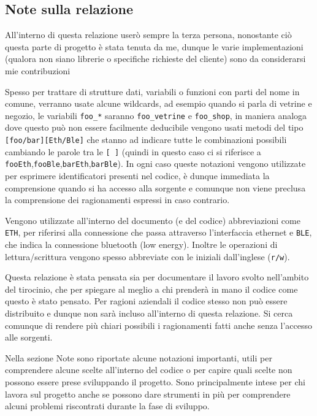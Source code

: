 \documentclass[a4paper,12pt]{article}
\begin{document}
\begin{em}

  \subsection{Note sulla relazione}

  All'interno di questa relazione user\`o sempre la terza persona, nonostante ci\`o questa parte di progetto \`e stata tenuta da me, dunque le varie implementazioni (qualora non siano librerie o specifiche richieste del cliente) sono da considerarsi mie contribuzioni

  Spesso per trattare di strutture dati, variabili o funzioni con parti del nome in comune, verranno usate alcune \textup{wildcards}, ad esempio quando si parla di vetrine e negozio, le variabili \textup{\texttt{foo\_*}} saranno \textup{\texttt{foo\_vetrine}} e \textup{\texttt{foo\_shop}}, in maniera analoga dove questo pu\`o non essere facilmente deducibile vengono usati metodi del tipo \textup{\texttt{[foo/bar][Eth/Ble]}} che stanno ad indicare tutte le combinazioni possibili cambiando le parole tra le \textup{\texttt{[ ]}} (quindi in questo caso ci si riferisce a \textup{\texttt{fooEth}},\textup{\texttt{fooBle}},\textup{\texttt{barEth}},\textup{\texttt{barBle}}). In ogni caso queste notazioni vengono utilizzate per esprimere identificatori presenti nel codice, \`e dunque immediata la comprensione quando si ha accesso alla sorgente e comunque non viene preclusa la comprensione dei ragionamenti espressi in caso contrario.

  Vengono utilizzate all'interno del documento (e del codice) abbreviazioni come \textup{\texttt{ETH}}, per riferirsi alla connessione che passa attraverso l'interfaccia ethernet e \textup{\texttt{BLE}}, che indica la connessione bluetooth (low energy). Inoltre le operazioni di lettura/scrittura vengono spesso abbreviate con le iniziali dall'inglese (\textup{\texttt{r/w}}).

  Questa relazione \`e stata pensata sia per documentare il lavoro svolto nell'ambito del tirocinio, che per spiegare al meglio a chi prender\`a in mano il codice come questo \`e stato pensato. Per ragioni aziendali il codice stesso non pu\`o essere distribuito e dunque non sar\`a incluso all'interno di questa relazione. Si cerca comunque di rendere pi\`u chiari possibili i ragionamenti fatti anche senza l'accesso alle sorgenti.

  Nella sezione \textup{Note} sono riportate alcune notazioni importanti, utili per comprendere alcune scelte all'interno del codice o per capire quali scelte non possono essere prese sviluppando il progetto. Sono principalmente intese per chi lavora sul progetto anche se possono dare strumenti in pi\`u per comprendere alcuni problemi riscontrati durante la fase di sviluppo.

\end{em}
\end{document}
